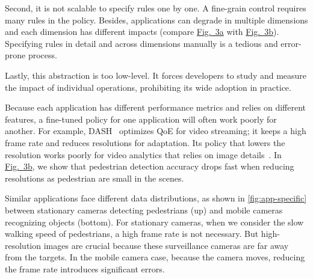 Second, it is not scalable to specify rules one by one. A fine-grain control
requires many rules in the policy. Besides, applications can degrade in multiple
dimensions and each dimension has different impacts (compare
\hyperref[fig:app-specific]{Fig.~3a} with \hyperref[fig:app-specific]{Fig.~3b}).
Specifying rules in detail and across dimensions manually is a tedious and
error-prone process.

Lastly, this abstraction is too low-level. It forces developers to study and
measure the impact of individual operations, prohibiting its wide adoption in
practice.

 Because each
application has different performance metrics and relies on different features,
a fine-tuned policy for one application will often work poorly for another. For
example, DASH~\cite{sodagar2011mpeg} optimizes QoE for video streaming; it keeps
a high frame rate and reduces resolutions for adaptation. Its policy that lowers
the resolution works poorly for video analytics that relies on image
details~\cite{lowe2004distinctive, viola2001rapid}. In
\hyperref[fig:app-specific]{Fig.~3b}, we show that pedestrian detection accuracy
drops fast when reducing resolutions as pedestrian are small in the scenes.

Similar applications face different data distributions, as shown in
\autoref{fig:app-specific} between stationary cameras detecting pedestrians (up)
and mobile cameras recognizing objects (bottom). For stationary cameras, when we
consider the slow walking speed of pedestrians, a high frame rate is not
necessary. But high-resolution images are crucial because these surveillance
cameras are far away from the targets. In the mobile camera case, because the
camera moves, reducing the frame rate introduces significant errors.


